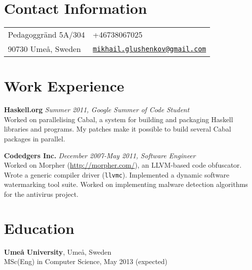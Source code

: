 \documentclass[margin,line]{res}
\begin{document}

\begin{resume}
\section{\sc Contact Information}
\vspace{.05in}
\begin{tabular}{@{}p{2in}p{4in}}
Pedagoggränd 5A/304&
+46738067025\\
90730 Umeå, Sweden&
\href{mailto:mikhail.glushenkov@gmail.com}
{\texttt{mikhail.glushenkov@gmail.com}}\\
\end{tabular}

\section{\sc Work Experience}

{\bf Haskell.org} \hfill {\it Summer 2011, Google Summer of Code Student}\\
Worked on parallelising Cabal, a system for building and packaging Haskell
libraries and programs. My patches make it possible to build several Cabal
packages in parallel.

{\bf Codedgers Inc.} \hfill {\it December 2007-May 2011, Software Engineer}\\
Worked on Morpher (\url{http://morpher.com/}), an LLVM-based code
obfuscator. Wrote a generic compiler driver (\texttt{llvmc}). Implemented a
dynamic software watermarking tool suite. Worked on implementing malware
detection algorithms for the antivirus project.



\section{\sc Education}
{\bf Umeå University}, Umeå, Sweden\\
MSc(Eng) in Computer Science, May 2013 (expected)


\end{resume}
\end{document}
